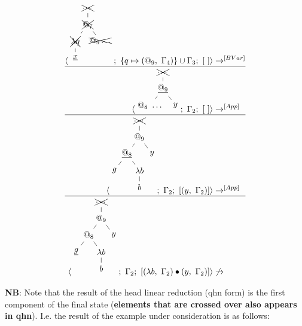 \documentclass[a4paper, 10pt]{article}
\begin{document}
\begin{align*}
\langle \begin{tikzpicture}[sibling distance=3em,level distance=2em]
    \node {\xcancel{$\dots$}}
    child { node {$\xcancel{@_7}$}
      child { node {$\xcancel{\lambda q}$}
        child { node {$\underline{x}$}}}
      child { node {$\xcancel{@_9 \dots}$}}};
\end{tikzpicture};\ \{q \mapsto (@_9,\ \Gamma_4)\} \cup \Gamma_3;\ [\ ] \rangle
& \rightarrow^{[BVar]}\\
\hline
\langle \begin{tikzpicture}[sibling distance=3em,level distance=2em]
    \node {\xcancel{$\dots$}}
    child { node {$\underline{@_9}$}
      child { node {$@_8\ \dots$}}
      child { node {$y$}}};
\end{tikzpicture};\ \Gamma_2;\ [\ ] \rangle
& \rightarrow^{[App]} \\
\hline
  \langle \begin{tikzpicture}[sibling distance=3em,level distance=2em]
    \node {\xcancel{$\dots$}}
    child { node {$@_9$}
      child { node {$\underline{@_8}$}
        child { node {$g$}}
        child { node {$\lambda b$}
          child { node {$b$}}}}
      child { node {$y$}}};
  \end{tikzpicture};\ \Gamma_2;\ [ (y,\ \Gamma_2) ] \rangle & \rightarrow^{[App]} \\
  \hline
  \langle \begin{tikzpicture}[sibling distance=3em,level distance=2em]
    \node {\xcancel{$\dots$}}
    child { node {$@_9$}
      child { node {$@_8$}
        child { node {$\underline{g}$}}
        child { node {$\lambda b$}
          child { node {$b$}}}}
      child { node {$y$}}};
  \end{tikzpicture};\ \Gamma_2;\ [(\lambda b,\ \Gamma_2) \bullet (y,\ \Gamma_2) ] \rangle & \not\rightarrow\\
\end{align*}

\textbf{NB}: Note that the result of the head linear reduction (qhn form) is the first component of
the final state (\textbf{elements that are crossed over also appears in qhn}). I.e. the result of the example
under consideration is as follows:
\end{document}
